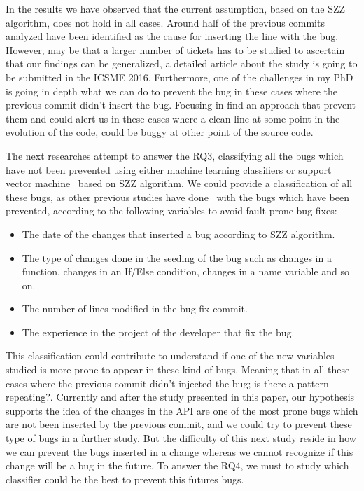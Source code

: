 \documentclass[ifip]{svmult}
\begin{document}
In the results we have observed that the current assumption, based on the SZZ algorithm, does not hold in all cases. Around half of the previous commits analyzed have been identified as the cause for inserting the line with the bug. However, may be that a larger number of tickets has to be studied to ascertain that our findings can be generalized, a detailed article about the study is going to be submitted in the ICSME 2016. Furthermore, one of the challenges in my PhD is going in depth what we can do to prevent the bug in these cases where the previous commit didn't insert the bug. Focusing in find an approach that prevent them and could alert us in these cases where a clean line at some point in the evolution of the code, could be buggy at other point of the source code. 

The next researches attempt to answer the RQ3, classifying all the bugs which have not been prevented using either machine learning classifiers or support vector machine~\cite{shivaji2009reducing,shivaji2013reducing} based on SZZ algorithm. We could provide a classification of all these bugs, as other previous studies have done~\cite{kim2008classifying,kamei2010revisiting,matsumoto2010analysis,hata2012bug,fujiwara2013assessing} with the bugs which have been prevented, according to the following variables to avoid fault prone bug fixes:

\begin{itemize}
  \item The date of the changes that inserted a bug according to SZZ algorithm.
  \item The type of changes done in the seeding of the bug such as changes in a function, changes in an If/Else condition, changes in a name variable and so on.
  \item The number of lines modified in the bug-fix commit.
  \item The experience in the project of the developer that fix the bug.
\end{itemize} 

This classification could contribute to understand if one of the new variables studied is more prone to appear in these kind of bugs. Meaning that in all these cases where the previous commit didn't injected the bug; is there a pattern repeating?. Currently and after the study presented in this paper, our hypothesis supports the idea of the changes in the API are one of the most prone bugs which are not been inserted by the previous commit, and we could try to prevent these type of bugs in a further study. But the difficulty of this next study reside in how we can prevent the bugs inserted in a change whereas we cannot recognize if this change will be a bug in the future. To answer the RQ4, we must to study which classifier could be the best to prevent this futures bugs.
\end{document}
